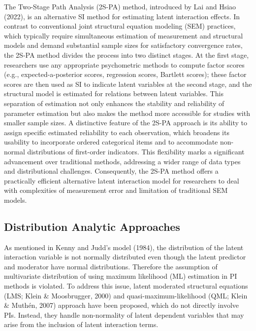 \documentclass[
  11pt,
  man]{apa6}
\begin{document}
The Two-Stage Path Analysis (2S-PA) method, introduced by Lai and Hsiao (2022), is an alternative SI method for estimating latent interaction effects. In contrast to conventional joint structural equation modeling (SEM) practices, which typically require simultaneous estimation of measurement and structural models and demand substantial sample sizes for satisfactory convergence rates, the 2S-PA method divides the process into two distinct stages. At the first stage, researchers use any appropriate psychometric methods to compute factor scores (e.g., expected-a-posterior scores, regression scores, Bartlett scores); these factor scores are then used as SI to indicate latent variables at the second stage, and the structural model is estimated for relations between latent variables. This separation of estimation not only enhances the stability and reliability of parameter estimation but also makes the method more accessible for studies with smaller sample sizes. A distinctive feature of the 2S-PA approach is its ability to assign specific estimated reliability to each observation, which broadens its usability to incorporate ordered categorical items and to accommodate non-normal distributions of first-order indicators. This flexibility marks a significant advancement over traditional methods, addressing a wider range of data types and distributional challenges. Consequently, the 2S-PA method offers a practically efficient alternative latent interaction model for researchers to deal with complexities of measurement error and limitation of traditional SEM models.

\hypertarget{distribution-analytic-approaches}{%
\subsection{Distribution Analytic Approaches}\label{distribution-analytic-approaches}}

As mentioned in Kenny and Judd's model (1984), the distribution of the latent interaction variable is not normally distributed even though the latent predictor and moderator have normal distributions. Therefore the assumption of multivariate distribution of using maximum likelihood (ML) estimation in PI methods is violated. To address this issue, latent moderated structural equations (LMS; Klein \& Moosbrugger, 2000) and quasi-maximum-likelihood (QML; Klein \& Muthén, 2007) approach have been proposed, which do not directly involve PIs. Instead, they handle non-normality of latent dependent variables that may arise from the inclusion of latent interaction terms.
\end{document}
